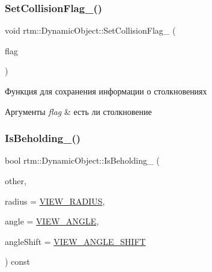 \subsubsection{\texorpdfstring{Set\+Collision\+Flag\+\_\+()}{SetCollisionFlag\_()}}
{\footnotesize\ttfamily void rtm\+::\+Dynamic\+Object\+::\+Set\+Collision\+Flag\+\_\+ (\begin{DoxyParamCaption}\item[{bool}]{flag }\end{DoxyParamCaption})\hspace{0.3cm}{\ttfamily [protected]}}

Функция для сохранения информации о столкновениях 
\begin{DoxyParams}{Аргументы}
{\em flag} & есть ли столкновение \\
\hline
\end{DoxyParams}
\mbox{\label{classrtm_1_1_dynamic_object_a8ed34444a34b29ff9a672839c6593558}} 
\subsubsection{\texorpdfstring{Is\+Beholding\+\_\+()}{IsBeholding\_()}}
{\footnotesize\ttfamily bool rtm\+::\+Dynamic\+Object\+::\+Is\+Beholding\+\_\+ (\begin{DoxyParamCaption}\item[{\hyperlink{classrtm_1_1_world_object}{World\+Object} const $\ast$const}]{other,  }\item[{float}]{radius = {\ttfamily \hyperlink{namespacertm_a6ae2631935a995c34abce1c62fa3dcd7}{V\+I\+E\+W\+\_\+\+R\+A\+D\+I\+US}},  }\item[{float}]{angle = {\ttfamily \hyperlink{namespacertm_af0ecac808d3938e77a20990f1947c8fd}{V\+I\+E\+W\+\_\+\+A\+N\+G\+LE}},  }\item[{float}]{angle\+Shift = {\ttfamily \hyperlink{namespacertm_a10eed490bb183c7853ac317d82e0b1cd}{V\+I\+E\+W\+\_\+\+A\+N\+G\+L\+E\+\_\+\+S\+H\+I\+FT}} }\end{DoxyParamCaption}) const\hspace{0.3cm}{\ttfamily [protected]}}

